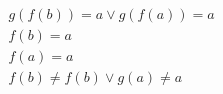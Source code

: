 \begin{align*}
%
& g(f(b)) = a \lor g(f(a)) = a
~\\~
& f(b) = a
~\\~
& f(a) = a
~\\~
& f(b)  \neq  f(b) \lor g(a)  \neq  a
%
\end{align*}
